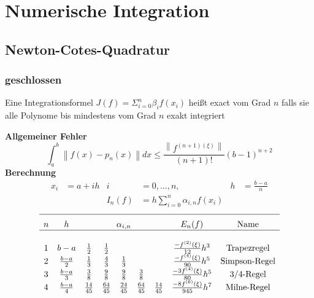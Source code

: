 \documentclass[
	ngerman,
	accentcolor=9c,%
	type=intern,
	marginpar=false
	]{tudapub}
\begin{document}
\section{Numerische Integration}
    \subsection{Newton-Cotes-Quadratur}
        \subsubsection{geschlossen}
            \begin{definition}
                Eine Integrationsformel $J(f) = \Sigma_{i=0}^n \beta_i f(x_i)$ heißt exact vom Grad $n$
                falls sie alle Polynome bis mindestens vom Grad $n$ exakt integriert 
            \end{definition}
            \textbf{Allgemeiner Fehler}
            \begin{equation*}
                \int_a^b \left\| f(x)  - p_n(x) \right\| dx \leq \dfrac{\left\| f^{(n+1)(\xi)}\right\|}{(n+1)!}(b-1)^{n+2}
            \end{equation*}
            \textbf{Berechnung}
            \begin{align*}
                x_i &= a+ih &  i&=0,\dots,n, &  h&=\frac{b-a}{n} \\
                & & I_n(f) &= h \sum^n_{i=0} \alpha_{i,n} f(x_i)
            \end{align*}
            \begin{equation*}
                \begin{array}{c c c c c c c c c}
                    \hline\\[-.5\normalbaselineskip]
                    n & h & \multicolumn{5}{c}{\alpha_{i,n}}& E_n (f) & \text{Name}\\
                    \hline\\
                    1 & b-a & \frac{1}{2} & \frac{1}{2} & & & & \frac{-f^{(2)}(\xi)}{12}h^3 & \text{Trapezregel}\\
                    2 & \frac{b-a}{2} & \frac{1}{3} & \frac{4}{3} & \frac{1}{3} & & & \frac{-f^{(4)}(\xi)}{90}h^5 & \text{Simpson-Regel}\\
                    3 & \frac{b-a}{3} & \frac{3}{8} & \frac{9}{8} & \frac{9}{8} & \frac{3}{8} & & \frac{-3f^{(4)}(\xi)}{80}h^5 & \text{3/4-Regel}\\
                    4 & \frac{b-a}{4} & \frac{14}{45} & \frac{64}{45} & \frac{24}{45} & \frac{64}{45} & \frac{14}{45} & \frac{-8f^{(6)}(\xi)}{945}h^7 & \text{Milne-Regel}\\
                \end{array}
            \end{equation*}
\end{document}
